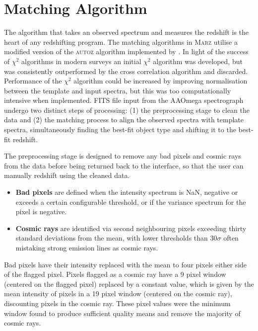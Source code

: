 \documentclass[5p]{elsarticle}
\newcommand{\autoz}{\textsc{autoz}}
\newcommand{\marz}{\textsc{Marz}}
\begin{document}
\section{Matching Algorithm} \label{sec:algorithm}



The algorithm that takes an observed spectrum and measures the redshift is the heart of any redshifting program. The matching algorithms in \marz{} utilise a modified version of the \autoz{} algorithm implemented by \citet{baldry2014galaxy}. In light of the success of $\chi^2$ algorithms in modern surveys \citep{BoltonSchlegel2012} an initial $\chi^2$ algorithm was developed, but was consistently outperformed by the cross correlation algorithm and discarded. Performance of the $\chi^2$ algorithm could be increased by improving normalisation between the template and input spectra, but this was too computationally intensive when implemented. FITS file input from the AAOmega spectrograph undergo two distinct steps of processing: (1) the preprocessing stage to clean the data and (2) the matching process to align the observed spectra with template spectra, simultaneously finding the best-fit object type and shifting it to the best-fit redshift.

The preprocessing stage is designed to remove any bad pixels and cosmic rays from the data before being returned back to the interface, so that the user can manually redshift using the cleaned data.
\begin{itemize}
\item \textbf{Bad pixels} are defined when the intensity spectrum is NaN, negative or exceeds a certain configurable threshold, or if the variance spectrum for the pixel is negative.
\item \textbf{Cosmic rays} are identified via second neighbouring pixels exceeding thirty standard deviations from the mean, with lower thresholds than $30\sigma$ often mistaking strong emission lines as cosmic rays. 
\end{itemize}
Bad pixels have their intensity replaced with the mean to four pixels either side of the flagged pixel. Pixels flagged as a cosmic ray have a 9 pixel window (centered on the flagged pixel) replaced by a constant value, which is given by the mean intensity of pixels in a 19 pixel window (centered on the cosmic ray), discounting pixels in the cosmic ray. These pixel values were the minimum window found to produce sufficient quality means and remove the majority of cosmic rays.
\end{document}
